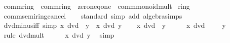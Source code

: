 \begin{isabellebody}
{\isafoldproof}%
%
\isadelimproof
\isanewline
%
\endisadelimproof
\isanewline
{}\isamarkupfalse%
\isanewline
\isanewline
{}\isamarkupfalse%
\ comm{\isacharunderscore}{\kern0pt}ring{\isacharunderscore}{\kern0pt}{}\ {\isacharequal}{\kern0pt}\ comm{\isacharunderscore}{\kern0pt}ring\ {\isacharplus}{\kern0pt}\ zero{\isacharunderscore}{\kern0pt}neq{\isacharunderscore}{\kern0pt}one\ {\isacharplus}{\kern0pt}\ comm{\isacharunderscore}{\kern0pt}monoid{\isacharunderscore}{\kern0pt}mult\isanewline
{}\isanewline
\isanewline
{}\isamarkupfalse%
\ ring{\isacharunderscore}{\kern0pt}{}%
\isadelimproof
\ %
\endisadelimproof
%
\isatagproof
\isacommand{{\isachardot}{\kern0pt}{\isachardot}{\kern0pt}}\isamarkupfalse%
%
\endisatagproof
{\isafoldproof}%
%
\isadelimproof
%
\endisadelimproof
\isanewline
{}\isamarkupfalse%
\ comm{\isacharunderscore}{\kern0pt}semiring{\isacharunderscore}{\kern0pt}{}{\isacharunderscore}{\kern0pt}cancel\isanewline
%
\isadelimproof
\ \ %
\endisadelimproof
%
\isatagproof
{}\isamarkupfalse%
\ standard\ {\isacharparenleft}{\kern0pt}simp\ add{\isacharcolon}{\kern0pt}\ algebra{\isacharunderscore}{\kern0pt}simps{\isacharparenright}{\kern0pt}%
\endisatagproof
{\isafoldproof}%
%
\isadelimproof
\isanewline
%
\endisadelimproof
\isanewline
{}\isamarkupfalse%
\ dvd{\isacharunderscore}{\kern0pt}minus{\isacharunderscore}{\kern0pt}iff\ {\isacharbrackleft}{\kern0pt}simp{\isacharbrackright}{\kern0pt}{\isacharcolon}{\kern0pt}\ {\isachardoublequoteopen}x\ dvd\ {\isacharminus}{\kern0pt}\ y\ {\isasymlongleftrightarrow}\ x\ dvd\ y{\isachardoublequoteclose}\isanewline
%
\isadelimproof
%
\endisadelimproof
%
\isatagproof
{}\isamarkupfalse%
\isanewline
\ \ \isamarkupfalse%
\ {\isachardoublequoteopen}x\ dvd\ {\isacharminus}{\kern0pt}\ y{\isachardoublequoteclose}\isanewline
\ \ \isamarkupfalse%
\ \isamarkupfalse%
\ {\isachardoublequoteopen}x\ dvd\ {\isacharminus}{\kern0pt}\ {}\ {\isacharasterisk}{\kern0pt}\ {\isacharminus}{\kern0pt}\ y{\isachardoublequoteclose}\ \isamarkupfalse%
\ {\isacharparenleft}{\kern0pt}rule\ dvd{\isacharunderscore}{\kern0pt}mult{\isacharparenright}{\kern0pt}\isanewline
\ \ \isamarkupfalse%
\ \isamarkupfalse%
\ {\isachardoublequoteopen}x\ dvd\ y{\isachardoublequoteclose}\ \isamarkupfalse%
\ simp\isanewline
{}\isamarkupfalse%
\isanewline
\ \ \isamarkupfalse%

\end{isabellebody}
